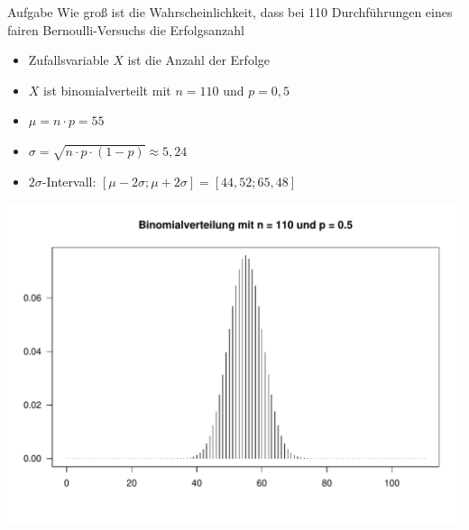 \documentclass[t,11pt,aspectratio=169]{beamer}
\begin{document}
\begin{frame}
\begin{block}{Aufgabe}
Wie groß ist die Wahrscheinlichkeit, dass bei 110 Durchführungen eines fairen Bernoulli-Versuchs die Erfolgsanzahl
\end{block}
\pause
\begin{itemize}
\item Zufallsvariable $X$ ist die Anzahl der Erfolge
\item $X$ ist binomialverteilt mit $n=110$ und $p=0,5$
\item $\mu = n\cdot p = 55$
\item $\sigma = \sqrt{n\cdot p\cdot (1-p)} \approx 5,24$
\item $2\sigma$-Intervall: $[ \mu-2\sigma;\mu+2\sigma  ] = [ 44,52; 65,48]$ 
\end{itemize}
\end{frame}

\begin{frame}
	\vspace{-0.2cm}
	\begin{center}
		\includegraphics[scale=0.55]{binom.pdf}
	\end{center}
\end{frame}
\end{document}
